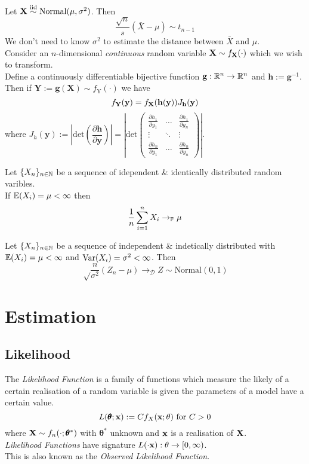 \documentclass[11pt,a4paper]{article}
\begin{document}
Let $\textbf{X}\overset{\text{iid}}{\sim}\text{Normal}(\mu,\sigma^2)$. Then
$$\frac{\sqrt{n}}{s}(\bar{X}-\mu)\sim t_{n-1}$$
\nb We don't need to know $\sigma^2$ to estimate the distance between $\bar{X}$ and $\mu$.\\

Consider an $n$-dimensional \textit{continuous} random variable $\textbf{X}\sim f_{\textbf{X}}(\cdot)$ which we wish to transform.\\
Define a continuously differentiable bijective function $\textbf{g}:\mathbb{R}^n\to\mathbb{R}^n$ and $\textbf{h}:=\textbf{g}^{-1}$.\\
Then if $\textbf{Y}:=\textbf{g}(\textbf{X})\sim f_\text{Y}(\cdot)$ we have
$$f_\textbf{Y}(\textbf{y})=f_{\textbf{X}}(\textbf{h}(\textbf{y}))J_\textbf{h}(\textbf{y})$$
where $J_h(\textbf{y}):=\left|\text{det}\left(\dfrac{\partial \textbf{h}}{\partial\textbf{y}}\right)\right|=\left|\text{det}\begin{pmatrix}\frac{\partial h_1}{\partial y_1}&\dots&\frac{\partial h_1}{\partial y_n}\\\vdots&\ddots&\vdots\\\frac{\partial h_n}{\partial y_1}&\dots&\frac{\partial h_n}{\partial y_n}\end{pmatrix}\right|$.

Let $\{X_n\}_{n\in\mathbb{N}}$ be a sequence of idependent \& identically distributed random varibles.\\
If $\mathbb{E}(X_i)=\mu<\infty$ then
$$\frac{1}{n}\sum_{i=1}^nX_i\to_{\mathbb{P}}\mu$$

Let $\{X_n\}_{n\in\mathbb{N}}$ be a sequence of independent \& indetically distributed with $\mathbb{E}(X_i)=\mu<\infty$ and $\mathrm{Var}(X_i)=\sigma^2<\infty$. Then\\
$$\sqrt\frac{n}{\sigma^2}(Z_n-\mu)\to_\mathcal{D}Z\sim\text{Normal}(0,1)$$

\section{Estimation}

\subsection{Likelihood}

The \textit{Likelihood Function} is a family of functions which measure the likely of a certain realisation of a random variable is given the parameters of a model have a certain value.
$$L(\pmb{\theta};\textbf{x}):=Cf_X(\textbf{x};\theta)\text{ for }C>0$$
where $\textbf{X}\sim f_n(\cdot;\pmb{\theta}^*)$ with $\pmb{\theta}^*$ unknown and $\textbf{x}$ is a realisation of $\textbf{X}$.\\
\nb \textit{Likelihood Functions} have signature $L(\cdot\textbf{x}):\theta\to[0,\infty)$.\\
\nb This is also known as the \textit{Observed Likelihood Function}.\\
\end{document}
